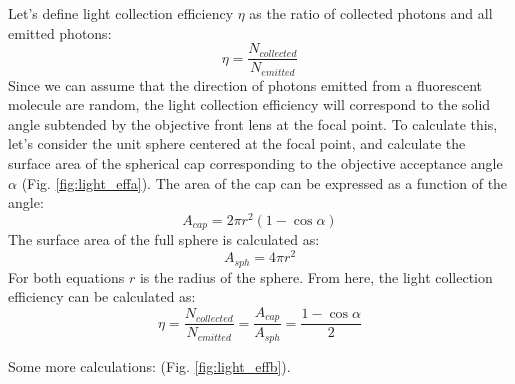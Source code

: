   Let's define light collection efficiency $\eta$ as the ratio of collected photons and all emitted photons:
  \[
  \eta = \frac{N_{collected}}{N_{emitted}}
  \]
  Since we can assume that the direction of photons emitted from a fluorescent molecule are random, the light collection efficiency will correspond to the solid angle subtended by the objective front lens at the focal point. To calculate this, let's consider the unit sphere centered at the focal point, and calculate the surface area of the spherical cap corresponding to the objective acceptance angle $\alpha$ (Fig. \ref{fig:light_effa}). The area of the cap can be expressed as a function of the angle:
  \[
  A_{cap} = 2\pi r^2 (1-\cos \alpha)
  \]
  The surface area of the full sphere is calculated as:
  \[
  A_{sph} = 4 \pi r^2
  \]
  For both equations $r$ is the radius of the sphere. From here, the light collection efficiency can be calculated as:
  \[
  \eta = \frac{N_{collected}}{N_{emitted}} = \frac{A_{cap}}{A_{sph}} = \frac{1-\cos \alpha}{2}
  \]

  Some more calculations: (Fig. \ref{fig:light_effb}).

